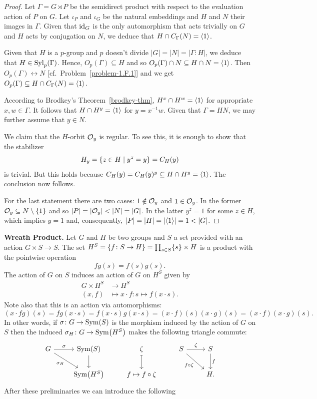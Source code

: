 \begin{proof} Let $\Gamma=G\rtimes P$ be the semidirect product with respect to the evaluation action of $P$ on $G$. Let $\iota_P$ and $\iota_G$ be the natural embeddings and $H$ and $N$ their images in $\Gamma$. Given that $\operatorname{id}_G$ is the only automorphism that acts trivially on $G$ and $H$ acts by conjugation on $N$, we deduce that $H\cap C_\Gamma(N)=\langle1\rangle$.

Given that $H$ is a $p$-group and $p$ doesn't divide $|G|=|N|=|\Gamma:H|$, we deduce that $H\in{\rm Syl}_p(\Gamma)$. Hence, $O_p(\Gamma)\subseteq H$ and so $O_p(\Gamma)\cap N\subseteq H\cap N=\langle1\rangle$. Then $O_p(\Gamma)\leftrightarrow N$ [cf.~Problem~\ref{problem-1.F.1}] and we get $O_p(\Gamma)\subseteq H\cap C_\Gamma(N)=\langle1\rangle$.

According to Brodkey's Theorem~\ref{brodkey-thm}, $H^x\cap H^w=\langle1\rangle$ for appropriate $x,w\in\Gamma$. It follows that $H\cap H^y=\langle1\rangle$ for $y=x^{-1}w$. Given that $\Gamma=HN$, we may further assume that $y\in N$.

We claim that the $H$-orbit ${\cal O}_y$ is regular. To see this, it is enough to show that the stabilizer
$$
    H_y=\{z\in H\mid y^z=y\}=C_H(y)
$$
is trivial. But this holds because $C_H(y)=C_H(y)^y\subseteq H\cap H^y=\langle1\rangle$. The conclusion now follows.

For the last statement there are two cases: $1\notin{\cal O}_y$ and $1\in{\cal O}_y$. In the former ${\cal O}_y\subseteq N\setminus\{1\}$ and so $|P|=|{\cal O}_y|<|N|=|G|$. In the latter $y^z=1$ for some $z\in H$, which implies $y=1$ and, consequently, $|P|=|H|=|\gen1|=1<|G|$.  \end{proof}

\medskip

\textbf{Wreath Product.} Let $G$ and $H$ be two groups and $S$ a set provided with an action $G\times S\to S$. The set $H^S=\{f\colon S\to H\}=\prod_{s\in S}\{s\}\times H$ is a product with the pointwise operation 
$$
    fg(s)=f(s)g(s).
$$
The action of $G$ on $S$ induces an action of $G$ on $H^S$ given by
\begin{align*}
    G\times H^S&\to H^S\\
    (x,f)&\mapsto x\cdot f\colon s\mapsto f(x\cdot s).
\end{align*}
Note also that this is an action via automorphisms:
$$
    (x\cdot fg)(s) = fg(x\cdot s) = f(x\cdot s)g(x\cdot s)
        = (x\cdot f)(s)(x\cdot g)(s)=(x\cdot f)(x\cdot g)(s).
$$
In other words, if $\sigma\colon G\to{\rm Sym}(S)$ is the morphism induced by the action of $G$ on $S$ then the induced $\sigma_H\colon G\to{\rm Sym}\big(H^S\big)$ makes the following triangle commute:
$$
    \begin{tikzcd}
        G \arrow[r, "\sigma"] \arrow[rd, "\sigma_H"']
            & \Sym(S) \arrow[d]
            & \zeta \arrow[d, maps to]
            & S \arrow[r, "\zeta"] \arrow[rd, "f\circ\zeta"']
            & S \arrow[d, "f"]
        \\& \Sym\big(H^S\big) & f\mapsto f\circ\zeta & & H.
    \end{tikzcd}
$$
After these preliminaries we can introduce the following

